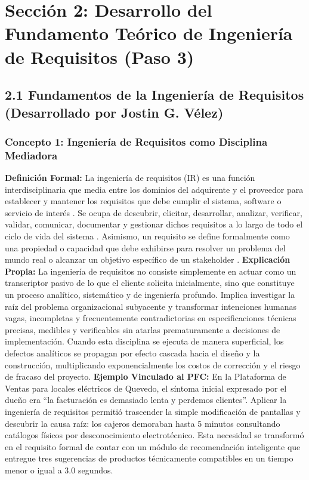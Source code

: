 \documentclass[conference,10pt]{IEEEtran}
\begin{document}
	\section{Sección 2: Desarrollo del Fundamento Teórico de Ingeniería de Requisitos (Paso 3)}
	\subsection{2.1 Fundamentos de la Ingeniería de Requisitos (Desarrollado por Jostin G. Vélez)}
	\subsubsection{Concepto 1: Ingeniería de Requisitos como Disciplina Mediadora}
	\textbf{Definición Formal:} La ingeniería de requisitos (IR) es una función interdisciplinaria que media entre los dominios del adquirente y el proveedor para establecer y mantener los requisitos que debe cumplir el sistema, software o servicio de interés \cite{ieee29148}. Se ocupa de descubrir, elicitar, desarrollar, analizar, verificar, validar, comunicar, documentar y gestionar dichos requisitos a lo largo de todo el ciclo de vida del sistema \cite{ieee29148, ieee15288}. Asimismo, un requisito se define formalmente como una propiedad o capacidad que debe exhibirse para resolver un problema del mundo real o alcanzar un objetivo específico de un stakeholder \cite{pohl2025, swebok2024}.
	\textbf{Explicación Propia:} La ingeniería de requisitos no consiste simplemente en actuar como un transcriptor pasivo de lo que el cliente solicita inicialmente, sino que constituye un proceso analítico, sistemático y de ingeniería profundo. Implica investigar la raíz del problema organizacional subyacente y transformar intenciones humanas vagas, incompletas y frecuentemente contradictorias en especificaciones técnicas precisas, medibles y verificables sin atarlas prematuramente a decisiones de implementación. Cuando esta disciplina se ejecuta de manera superficial, los defectos analíticos se propagan por efecto cascada hacia el diseño y la construcción, multiplicando exponencialmente los costos de corrección y el riesgo de fracaso del proyecto.
	\textbf{Ejemplo Vinculado al PFC:} En la Plataforma de Ventas para locales eléctricos de Quevedo, el síntoma inicial expresado por el dueño era ``la facturación es demasiado lenta y perdemos clientes''. Aplicar la ingeniería de requisitos permitió trascender la simple modificación de pantallas y descubrir la causa raíz: los cajeros demoraban hasta 5 minutos consultando catálogos físicos por desconocimiento electrotécnico. Esta necesidad se transformó en el requisito formal de contar con un módulo de recomendación inteligente que entregue tres sugerencias de productos técnicamente compatibles en un tiempo menor o igual a 3.0 segundos.
\end{document}
